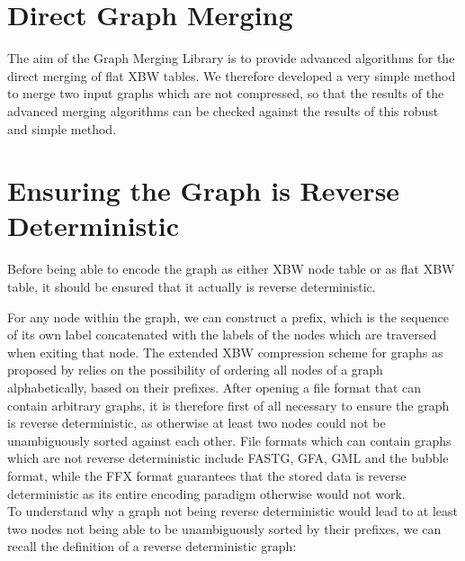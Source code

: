 \documentclass[a4paper,12pt,twoside,BCOR=10mm]{scrbook}
\begin{document}
\section{Direct Graph Merging}

The aim of the Graph Merging Library is to provide advanced algorithms 
for the direct merging of flat XBW tables. 
We therefore developed a very simple method to merge two input graphs 
which are not compressed, so that the results of the advanced merging 
algorithms can be checked against the results of this robust and simple method.


\section{Ensuring the Graph is Reverse Deterministic}
\label{sec:why_rev_det}
%

Before being able to encode the graph as either XBW node table or as flat XBW table, 
it should be ensured that it actually is reverse deterministic.

For any node within the graph, we can construct a prefix, 
which is the sequence of its own label concatenated with the labels of the nodes which are 
traversed when exiting that node. 
The extended XBW compression scheme for graphs as proposed by \citet{Siren2014} relies 
on the possibility of ordering all nodes of a graph alphabetically, based on their prefixes. 
After opening a file format that can contain arbitrary graphs, 
it is therefore first of all necessary to ensure the graph is reverse deterministic, 
as otherwise at least two nodes could not be unambiguously sorted against each other. 
File formats which can contain graphs which are not reverse deterministic include 
FASTG, GFA, GML and the bubble format, while the FFX format guarantees that 
the stored data is reverse deterministic as its entire encoding paradigm 
otherwise would not work. \\
To understand why a graph not being reverse deterministic would lead to 
at least two nodes not being able to be unambiguously sorted by their prefixes, 
we can recall the definition of a reverse deterministic graph:
\end{document}

